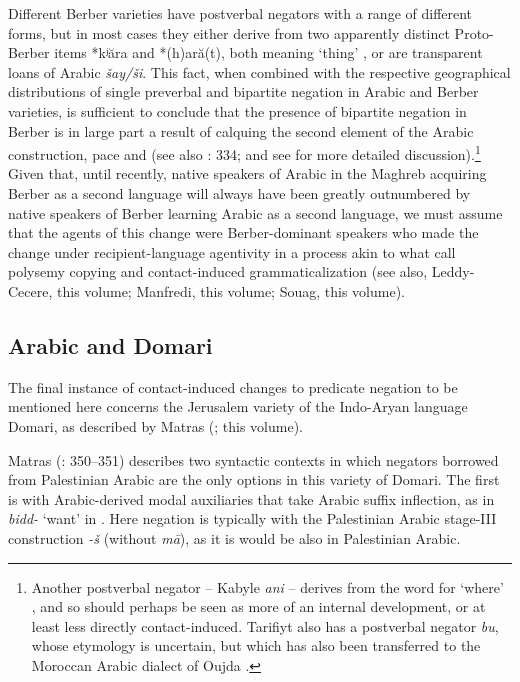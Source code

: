 \documentclass[output=paper]{langsci/langscibook}
\begin{document}
{Different Berber varieties have postverbal negators with a range of different forms, but in most cases they either derive from two apparently distinct Proto-Berber items *kʲăra and *(h)ară(t), both meaning ‘thing’ \citep[332]{Kossmann2013book}, or are transparent loans of Arabic \textit{šay/ši}. This fact, when combined with the respective geographical distributions of single preverbal and bipartite negation in Arabic and Berber varieties, is sufficient to conclude that the presence of bipartite negation in Berber is in large part a result of calquing the second element of the Arabic construction, pace \citet{Brugnatelli1987} and \citet{Lafkioui2013reinventing} (see also \citealt{Kossmann2013book}: 334; and see \citealt{Lucas2007,Lucas2009} for more detailed discussion).\footnote{Another postverbal negator – Kabyle \textit{ani} – derives from the word for ‘where’ \citep{Rabhi1992}, and so should perhaps be seen as more of an internal development, or at least less directly contact-induced. Tarifiyt also has a postverbal negator \textit{bu}, whose etymology is uncertain, but which has also been transferred to the Moroccan Arabic dialect of Oujda \citep{Lafkioui2013bu}.} Given that, until recently, native speakers of Arabic in the Maghreb acquiring Berber as a second language will always have been greatly outnumbered by native speakers of Berber learning Arabic as a second language, we must assume that the agents of this change were Berber-dominant speakers who made the change under recipient-language agentivity in a process akin to what \citet{HeineKuteva2005} call polysemy copying and contact-induced grammaticalization (see also, Leddy-Cecere, this volume; Manfredi, this volume; Souag, this volume).}


\subsection{Arabic and Domari}


The final instance of contact-induced changes to predicate negation to be mentioned here concerns the Jerusalem variety of the Indo-Aryan language Domari, as described by Matras (\citeyear{Matras1999,Matras2007Domari,Matras2012}; this volume). 

Matras (\citeyear{Matras2012}: 350–351) describes two syntactic contexts in which negators borrowed from Palestinian Arabic are the only options in this variety of Domari. The first is with Arabic-derived modal auxiliaries that take Arabic suffix inflection, as in \textit{bidd-} ‘want’ in . Here negation is typically with the Palestinian Arabic stage-III construction \textit{{}-š} (without \textit{mā}), as it is would be also in Palestinian Arabic.
\end{document}
